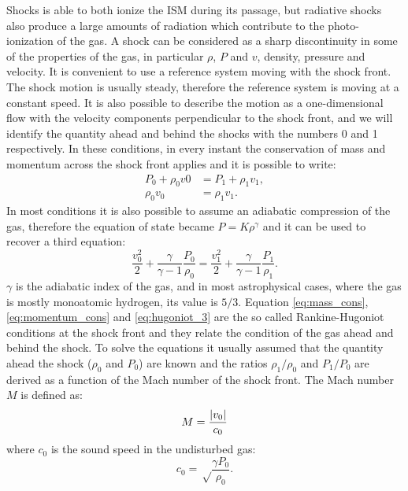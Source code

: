 \documentclass[../thesis.tex]{subfiles}
\begin{document}
Shocks is able to both ionize the ISM during its passage, but radiative shocks also produce a large amounts of radiation which contribute to the photo-ionization of the gas.
A shock can be considered as a sharp discontinuity in some of the properties of the gas, in particular $\rho$, $P$ and $v$, density, pressure and velocity.
It is convenient to use a reference system moving with the shock front.
The shock motion is usually steady, therefore the reference system is moving at a constant speed.
It is also possible to describe the motion as a one-dimensional flow with the velocity components perpendicular to the shock front, and we will identify the quantity ahead and behind the shocks with the numbers 0 and 1 respectively.
In these conditions, in every instant the conservation of mass and momentum across the shock front applies and it is possible to write:
\begin{align}
    \label{eq:mass_cons}
    P_0 + \rho_0 v0 &= P_1+\rho_1 v_1,\\
    \label{eq:momentum_cons}
    \rho_0 v_0 &= \rho_1 v_1.
\end{align}
In most conditions it is also possible to assume an adiabatic compression of the gas, therefore the equation of state became $P = K \rho^{\gamma}$ and it can be used to recover a third equation:
\begin{equation}
    \label{eq:hugoniot_3}
    \frac{v^2_0}{2} + \frac{\gamma}{\gamma-1}\frac{P_0}{\rho_0} = \frac{v^2_1}{2} + \frac{\gamma}{\gamma-1}\frac{P_1}{\rho_1}.
\end{equation}
$\gamma$ is the adiabatic index of the gas, and in most astrophysical cases, where the gas is mostly monoatomic hydrogen, its value is $5/3$.
Equation \ref{eq:mass_cons}, \ref{eq:momentum_cons} and \ref{eq:hugoniot_3} are the so called Rankine-Hugoniot conditions at the shock front and they relate the condition of the gas ahead and behind the shock.
To solve the equations it usually assumed that the quantity ahead the shock ($\rho_0$ and $P_0$) are known and the ratios $\rho_1/\rho_0$ and $P_1/P_0$ are derived as a function of the Mach number of the shock front.
The Mach number $M$ is defined as:
\begin{equation}
    \label{eq:mach}
    M = \frac{\lvert v_0\rvert}{c_0}
\end{equation}
where $c_0$ is the sound speed in the undisturbed gas:
\begin{equation}
    \label{eq:soundspeed}
    c_0 = \sqrt\frac{\gamma P_0}{\rho_0}.
\end{equation}
\end{document}
